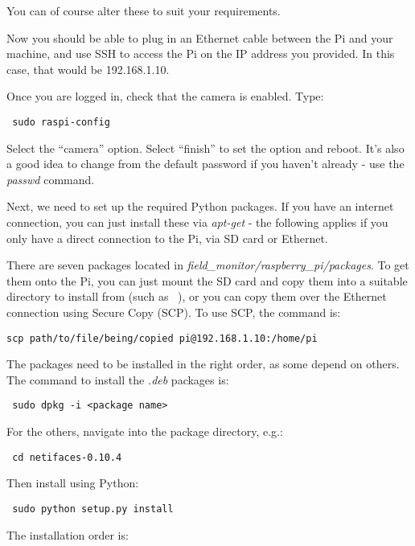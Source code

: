 \documentclass[10pt]{article}
\begin{document}
You can of course alter these to suit your requirements.

Now you should be able to plug in an Ethernet cable between the Pi and your machine, and use SSH to access the Pi on the IP address you provided. In this case, that 
would be 192.168.1.10.

Once you are logged in, check that the camera is enabled. Type:

\begin{verbatim}
 sudo raspi-config
\end{verbatim}

Select the ``camera'' option. Select ``finish'' to set the option and reboot. It's also a good idea to change from the default password if you haven't already - 
use the \textit{passwd} command. 

Next, we need to set up the required Python packages. If you have an internet connection, you can just install these via \textit{apt-get} - the following applies if 
you only have a direct connection to the Pi, via SD card or Ethernet.

There are seven packages located in \textit{field\_monitor/raspberry\_pi/packages}. To get them onto the Pi, you can just mount the SD card
and copy them into a suitable directory to install from (such as ~), or you can copy them over the Ethernet connection using Secure Copy (SCP). To use SCP, the 
command is:

\begin{verbatim}
scp path/to/file/being/copied pi@192.168.1.10:/home/pi
\end{verbatim}

The packages need to be installed in the right order, as some depend on others. The command to install the \textit{.deb} packages is:

\begin{verbatim}
 sudo dpkg -i <package name>
\end{verbatim}

For the others, navigate into the package directory, e.g.:

\begin{verbatim}
 cd netifaces-0.10.4
\end{verbatim}

Then install using Python:

\begin{verbatim}
 sudo python setup.py install
\end{verbatim}

The installation order is:
\end{document}
